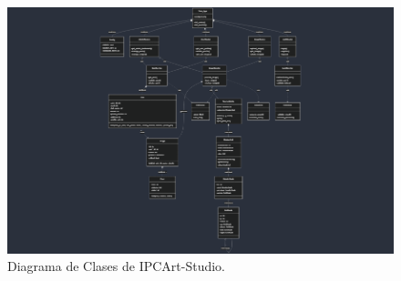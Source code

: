 \documentclass[letterpaper,12pt]{article}
\begin{document}
\vspace{1cm}
\begin{figure}[!htb]

    \centering
    \includegraphics[width=1.1\textwidth, angle=90]{images/diagrama_clases.png}
    \caption{Diagrama de Clases de IPCArt-Studio.}
    \label{fig:diagrama_clases}
\end{figure}


\clearpage
\end{document}
